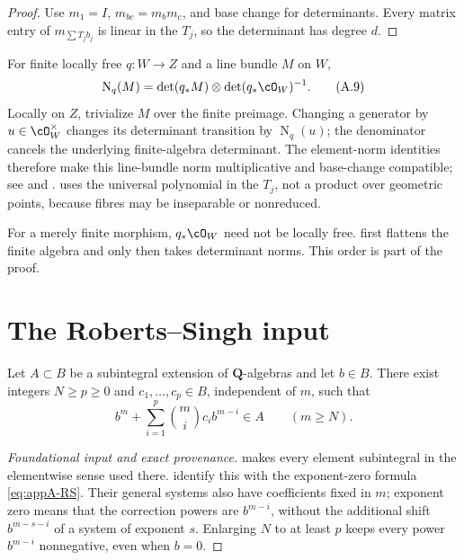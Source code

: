 \begin{proof}
Use \(m_1=I\), \(m_{bc}=m_bm_c\), and base change for determinants.
Every matrix entry of \(m_{\sum T_jb_j}\) is linear in the \(T_j\), so the
determinant has degree \(d\).
\end{proof}

For finite locally free \(q:W\to Z\) and a line bundle \(M\) on \(W\),
\[
 \operatorname N_q(M)
 =\det(q_*M)\otimes\det(q_*\cO_W)^{-1}.
\tag{A.9}\label{eq:appA-norm-line}
\]
Locally on \(Z\), trivialize \(M\) over the finite preimage.  Changing
a generator by \(u\in\cO_W^\times\) changes its determinant transition
by \(\operatorname N_q(u)\); the denominator cancels the underlying
finite-algebra determinant.  The element-norm identities therefore make
this line-bundle norm multiplicative and base-change compatible; see
\cite{FerrandNorm} and
\cite[\href{https://stacks.math.columbia.edu/tag/0BD2}{Tag 0BD2}]
{stacks-project}.   uses the universal
polynomial in the \(T_j\), not a product over geometric points, because
fibres may be inseparable or nonreduced.

\begin{remark}
\label{rem:appA-flatten-before-norms}
For a merely finite morphism, \(q_*\cO_W\) need not be locally free.
 first flattens the finite algebra and
only then takes determinant norms.  This order is part of the proof.
\end{remark}

\section{The Roberts--Singh input}
\label{sec:appA-roberts-singh}

\begin{theorem}\label{thm:appA-roberts-singh}
Let \(A\subset B\) be a subintegral extension of \(\mathbf Q\)-algebras
and let \(b\in B\).  There exist integers \(N\geq p\geq0\) and
\(c_1,\ldots,c_p\in B\), independent of \(m\), such that
\begin{equation*}
 b^m+\sum_{i=1}^{p}\binom mi c_i b^{m-i}\in A
 \qquad(m\geq N).
 \tag{A.10}\label{eq:appA-RS}
\end{equation*}
\end{theorem}

\begin{proof}[Foundational input and exact provenance]
\cite[Theorem~4.17]{RobertsSingh} makes every element subintegral in the
elementwise sense used there.
\cite[Proposition~4.2 and Corollary~4.3]{RobertsSingh} identify this with
the exponent-zero formula \eqref{eq:appA-RS}.  Their general systems
also have coefficients fixed in \(m\); exponent zero means that the
correction powers are \(b^{m-i}\), without the additional shift
\(b^{m-s-i}\) of a system of exponent \(s\).  Enlarging \(N\) to at least
\(p\) keeps every power \(b^{m-i}\) nonnegative, even when \(b=0\).
\end{proof}

